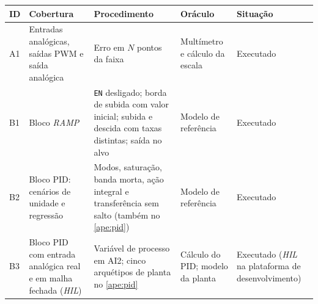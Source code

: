 \begin{quadrofixo}
    \centering
    \small\singlespacing
    \begin{tabular}{|p{0.8cm}|p{3.2cm}|p{4.8cm}|p{2.8cm}|p{2.3cm}|}
        \hline
        ID & Cobertura & Procedimento & Oráculo & Situação \\
        \hline
        A1 & Entradas analógicas, saídas PWM e saída analógica & Erro em $N$ pontos da faixa & Multímetro e cálculo da escala & Executado \\
        \hline
        B1 & Bloco \textit{RAMP} & \texttt{EN} desligado; borda de subida com valor inicial; subida e descida com taxas distintas; saída no alvo & Modelo de referência & Executado \\
        \hline
        B2 & Bloco PID: cenários de unidade e regressão & Modos, saturação, banda morta, ação integral e transferência sem salto (também no \ref{ape:pid}) & Modelo de referência & Executado \\
        \hline
        B3 & Bloco PID com entrada analógica real e em malha fechada (\textit{HIL}) & Variável de processo em AI2; cinco arquétipos de planta no \ref{ape:pid} & Cálculo do PID; modelo da planta & Executado (\textit{HIL} na plataforma de desenvolvimento) \\
        \hline
    \end{tabular}
    \label{qua:testes-controle}
\end{quadrofixo}

